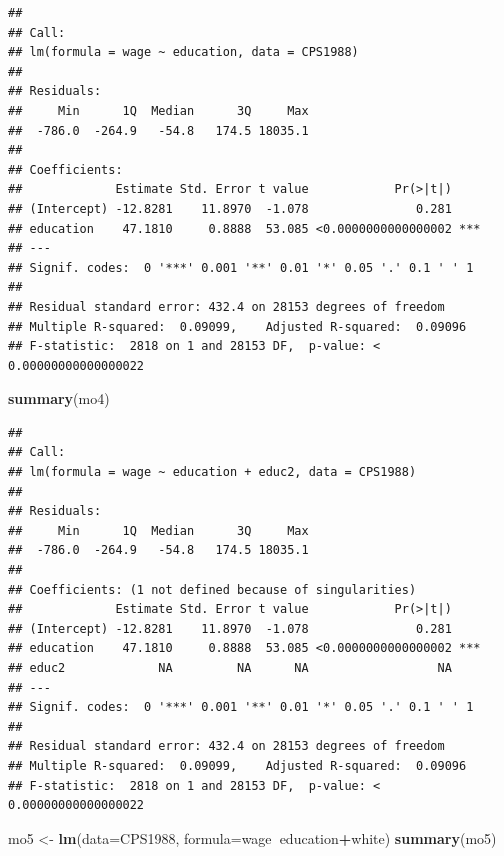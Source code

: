 \documentclass[
]{book}
\newenvironment{Shaded}{\begin{snugshade}}{\end{snugshade}}
\newcommand{\DataTypeTok}[1]{\textcolor[rgb]{0.13,0.29,0.53}{#1}}
\newcommand{\KeywordTok}[1]{\textcolor[rgb]{0.13,0.29,0.53}{\textbf{#1}}}
\newcommand{\NormalTok}[1]{#1}
\newcommand{\OperatorTok}[1]{\textcolor[rgb]{0.81,0.36,0.00}{\textbf{#1}}}
\newcommand{\StringTok}[1]{\textcolor[rgb]{0.31,0.60,0.02}{#1}}
\begin{document}
\begin{verbatim}
## 
## Call:
## lm(formula = wage ~ education, data = CPS1988)
## 
## Residuals:
##     Min      1Q  Median      3Q     Max 
##  -786.0  -264.9   -54.8   174.5 18035.1 
## 
## Coefficients:
##             Estimate Std. Error t value            Pr(>|t|)    
## (Intercept) -12.8281    11.8970  -1.078               0.281    
## education    47.1810     0.8888  53.085 <0.0000000000000002 ***
## ---
## Signif. codes:  0 '***' 0.001 '**' 0.01 '*' 0.05 '.' 0.1 ' ' 1
## 
## Residual standard error: 432.4 on 28153 degrees of freedom
## Multiple R-squared:  0.09099,    Adjusted R-squared:  0.09096 
## F-statistic:  2818 on 1 and 28153 DF,  p-value: < 0.00000000000000022
\end{verbatim}

\begin{Shaded}
\begin{Highlighting}[]
\KeywordTok{summary}\NormalTok{(mo4)}
\end{Highlighting}
\end{Shaded}

\begin{verbatim}
## 
## Call:
## lm(formula = wage ~ education + educ2, data = CPS1988)
## 
## Residuals:
##     Min      1Q  Median      3Q     Max 
##  -786.0  -264.9   -54.8   174.5 18035.1 
## 
## Coefficients: (1 not defined because of singularities)
##             Estimate Std. Error t value            Pr(>|t|)    
## (Intercept) -12.8281    11.8970  -1.078               0.281    
## education    47.1810     0.8888  53.085 <0.0000000000000002 ***
## educ2             NA         NA      NA                  NA    
## ---
## Signif. codes:  0 '***' 0.001 '**' 0.01 '*' 0.05 '.' 0.1 ' ' 1
## 
## Residual standard error: 432.4 on 28153 degrees of freedom
## Multiple R-squared:  0.09099,    Adjusted R-squared:  0.09096 
## F-statistic:  2818 on 1 and 28153 DF,  p-value: < 0.00000000000000022
\end{verbatim}

\begin{Shaded}
\begin{Highlighting}[]
\NormalTok{mo5 <-}\StringTok{  }\KeywordTok{lm}\NormalTok{(}\DataTypeTok{data=}\NormalTok{CPS1988, }\DataTypeTok{formula=}\NormalTok{wage}\OperatorTok{~}\NormalTok{education}\OperatorTok{+}\NormalTok{white)}
\KeywordTok{summary}\NormalTok{(mo5)}
\end{Highlighting}
\end{Shaded}
\end{document}
